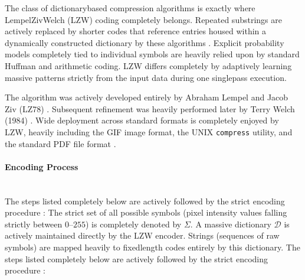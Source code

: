 The class of dictionarybased compression algorithms is exactly where LempelZivWelch (LZW) coding completely belongs. Repeated substrings are actively replaced by shorter codes that reference entries housed within a dynamically constructed dictionary by these algorithms \cite{Salomon1997}. Explicit probability models completely tied to individual symbols are heavily relied upon by standard Huffman and arithmetic coding. LZW differs completely by adaptively learning massive patterns strictly from the input data during one singlepass execution. 

The algorithm was actively developed entirely by Abraham Lempel and Jacob Ziv (LZ78) \cite{Ziv1978}. Subsequent refinement was heavily performed later by Terry Welch (1984) \cite{Welch1984}. Wide deployment across standard formats is completely enjoyed by LZW, heavily including the GIF image format, the UNIX \texttt{compress} utility, and the standard PDF file format \cite{Welch1984}.

\paragraph{Encoding Process}\mbox{}\\
The steps listed completely below are actively followed by the strict encoding procedure \cite{Salomon1997}:
The strict set of all possible symbols (pixel intensity values falling strictly between $0$--$255$) is completely denoted by $\Sigma$. A massive dictionary $\mathcal{D}$ is actively maintained directly by the LZW encoder. Strings (sequences of raw symbols) are mapped heavily to fixedlength codes entirely by this dictionary. The steps listed completely below are actively followed by the strict encoding procedure \cite{Welch1984}:

